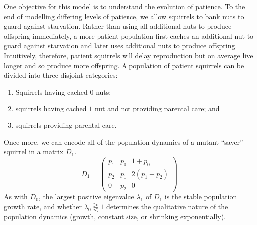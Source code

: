 \documentclass[titlepage, hidelinks, 12pt]{article}
\theoremstyle{plain}
\theoremstyle{remark}
\theoremstyle{definition}
\begin{document}
One objective for this model is to understand the evolution of patience. To the end of modelling differing levels of patience, we allow
squirrels to bank nuts to guard against starvation.
Rather than using all additional nuts to produce offspring immediately, a more patient population first caches an additional nut to guard against starvation
and later uses additional nuts to produce offspring. Intuitively, therefore, patient squirrels will delay reproduction but on average live
longer and so produce more offspring. A population of patient squirrels can be divided into three disjoint categories:
\begin{enumerate}
    \item Squirrels having cached $0$ nuts;
    \item squirrels having cached $1$ nut and not providing parental care; and
    \item squirrels providing parental care.
\end{enumerate}
Once more, we can encode all of the population dynamics of a mutant ``saver'' squirrel in a matrix $D_1$. 
\begin{equation}
D_1 =
\begin{pmatrix}
    p_1 & p_0 & 1+p_0 \\ p_2 & p_1 & 2(p_1 + p_2) \\ 0 & p_2 & 0
\end{pmatrix}
    \label{eqn:D1}
\end{equation}
As with $D_0$, the largest positive eigenvalue $\lambda_1$ of $D_1$ is the stable population growth rate, and whether $\lambda_0\gtreqless 1$ determines
the qualitative nature of the population dynamics (growth, constant size, or shrinking exponentially).
\end{document}
